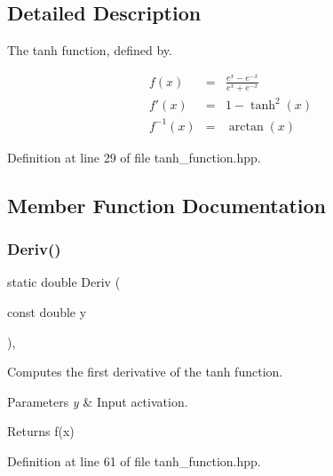 \subsection{Detailed Description}
The tanh function, defined by. 

\begin{eqnarray*} f(x) &=& \frac{e^x - e^{-x}}{e^x + e^{-x}} \\ f'(x) &=& 1 - \tanh^2(x) \\ f^{-1}(x) &=& \arctan(x) \end{eqnarray*} 

Definition at line 29 of file tanh\+\_\+function.\+hpp.



\subsection{Member Function Documentation}
\mbox{\label{classmlpack_1_1ann_1_1TanhFunction_a163d34fd09f8edf457164f5033c635cf}} 
\subsubsection{Deriv()\hspace{0.1cm}{\footnotesize\ttfamily [1/2]}}
{\footnotesize\ttfamily static double Deriv (\begin{DoxyParamCaption}\item[{const double}]{y }\end{DoxyParamCaption})\hspace{0.3cm}{\ttfamily [inline]}, {\ttfamily [static]}}



Computes the first derivative of the tanh function. 


\begin{DoxyParams}{Parameters}
{\em y} & Input activation. \\
\hline
\end{DoxyParams}
\begin{DoxyReturn}{Returns}
f\textquotesingle{}(x) 
\end{DoxyReturn}


Definition at line 61 of file tanh\+\_\+function.\+hpp.

\mbox{\label{classmlpack_1_1ann_1_1TanhFunction_ad442502c34b67303b74c735641dab790}} 
